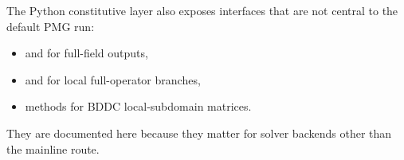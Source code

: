 The Python constitutive layer also exposes interfaces that are not central to
the default PMG run:
\begin{itemize}
\item {} and  for full-field outputs,
\item {} and  for
local full-operator branches,
\item {} methods for BDDC local-subdomain matrices.
\end{itemize}

They are documented here because they matter for solver backends other than the
mainline  route.
